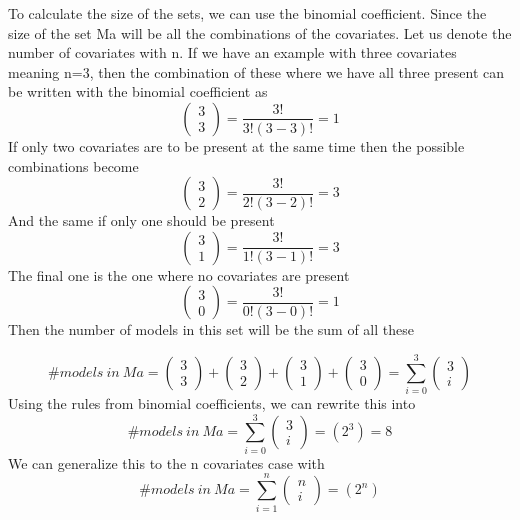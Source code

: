 To calculate the size of the sets, we can use the binomial coefficient. Since the size of the set Ma will be all the combinations of the covariates. Let us denote the number of covariates with n. If we have an example with three covariates meaning n=3, then the combination of these where we have all three present can be written with the binomial coefficient as
\[\left( \begin{array}{c}
3 \\ 
3 \end{array}
\right)=\frac{3!}{3!\left(3-3\right)!}=1\] 
If only two covariates are to be present at the same time then the possible combinations become 
\[\left( \begin{array}{c}
3 \\ 
2 \end{array}
\right)=\frac{3!}{2!\left(3-2\right)!}=3\] 
And the same if only one should be present
\[\left( \begin{array}{c}
3 \\ 
1 \end{array}
\right)=\frac{3!}{1!\left(3-1\right)!}=3\] 
The final one is the one where no covariates are present
\[\left( \begin{array}{c}
3 \\ 
0 \end{array}
\right)=\frac{3!}{0!\left(3-0\right)!}=1\] 
Then the number of models in this set will be the sum of all these


\[\#models\ in\ Ma=\left( \begin{array}{c}
3 \\ 
3 \end{array}
\right)+\left( \begin{array}{c}
3 \\ 
2 \end{array}
\right)+\left( \begin{array}{c}
3 \\ 
1 \end{array}
\right)+\left( \begin{array}{c}
3 \\ 
0 \end{array}
\right)=\sum^3_{i=0}{\left( \begin{array}{c}
3 \\ 
i \end{array}
\right)}\] 
Using the rules from binomial coefficients, we can rewrite this into
\[\#models\ in\ Ma=\sum^3_{i=0}{\left( \begin{array}{c}
3 \\ 
i \end{array}
\right)}=\left(2^3\right)=8\] 
We can generalize this to the n covariates case with 
\[\#models\ in\ Ma=\sum^n_{i=1}{\left( \begin{array}{c}
n \\ 
i \end{array}
\right)}=\left(2^n\right)\] 


